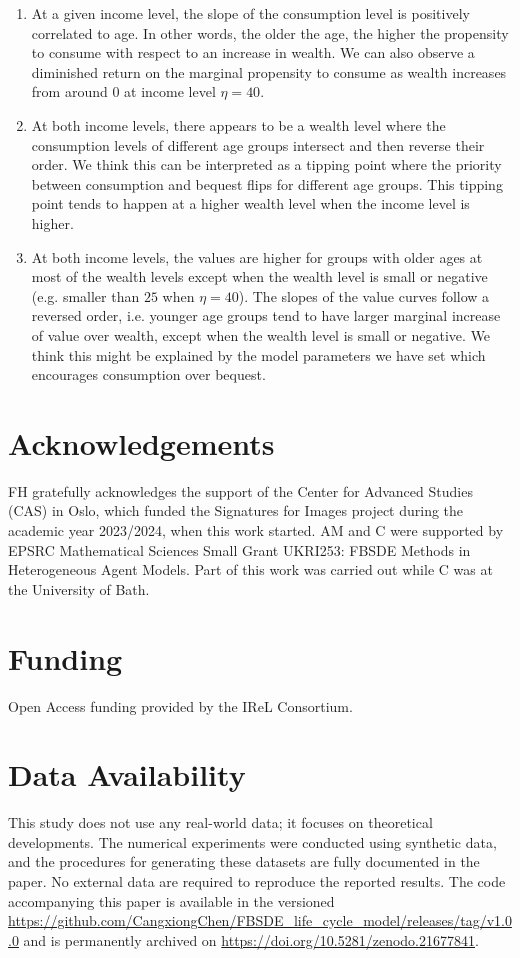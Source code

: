 \documentclass[11pt,oneside,english,reqno,dvipsnames,table]{amsart}
\numberwithin{equation}{section}
\theoremstyle{plain}
\theoremstyle{definition}
\theoremstyle{remark}
\theoremstyle{plain}
\theoremstyle{plain}
\theoremstyle{plain}
\theoremstyle{plain}
\theoremstyle{plain}
\theoremstyle{plain}
\theoremstyle{plain}
\numberwithin{thm}{section}
\begin{document}
\begin{enumerate}
    \item [1.] At a given income level, the slope of the consumption level is positively correlated to age. In other words, the older the age, the higher the propensity to consume with respect to an increase in wealth. We can also observe a diminished return on the marginal propensity to consume as wealth increases from around $0$ at income level $\eta = 40$.
    \item [2.] At both income levels, there appears to be a wealth level where the consumption levels of different age groups intersect and then reverse their order. We think this can be interpreted as a tipping point where the priority between consumption and bequest flips for different age groups. This tipping point tends to happen at a higher wealth level when the income level is higher.
    \item [3.] At both income levels, the values are higher for groups with older ages at most of the wealth levels except when the wealth level is small or negative (e.g. smaller than $25$ when $\eta = 40$). The slopes of the value curves follow a reversed order, i.e. younger age groups tend to have larger marginal increase of value over wealth, except when the wealth level is small or negative. We think this might be explained by the model parameters we have set which encourages consumption over bequest.    
\end{enumerate}    

\section*{Acknowledgements}
FH gratefully acknowledges the support of the Center for Advanced Studies (CAS) in Oslo, which funded the Signatures for Images project during the academic year 2023/2024, when this work started. AM and C were supported by EPSRC Mathematical Sciences Small Grant UKRI253: FBSDE Methods in Heterogeneous Agent Models. Part of this work was carried out while C was at the University of Bath.

\section*{Funding}
Open Access funding provided by the IReL Consortium.

\section*{Data Availability}
This study does not use any real-world data; it focuses on theoretical developments.
The numerical experiments were conducted using synthetic data, and the procedures for generating these datasets are fully documented in the paper. No external data are required to reproduce the reported results. The code accompanying this paper is available in the versioned \url{https://github.com/CangxiongChen/FBSDE_life_cycle_model/releases/tag/v1.0.0} and is permanently archived on \url{https://doi.org/10.5281/zenodo.21677841}.
\end{document}
